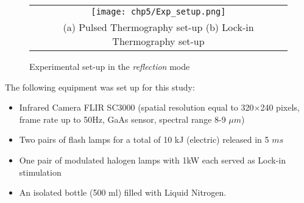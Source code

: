 \begin{figure}[ht]
   \hspace{-0.95cm}
   \begin{tabular}{c}
   \texttt{[image: chp5/Exp\_setup.png]}
   \\
   \footnotesize{(a) Pulsed Thermography set-up} \hspace{4cm} \footnotesize{(b) Lock-in Thermography set-up}   
   \end{tabular}  
   \caption{Experimental set-up in the \textit{reflection} mode}
   \label{Exp_setup}
\end{figure}


The following equipment was set up for this study:
\begin{itemize}
   \item Infrared Camera FLIR SC3000 (spatial resolution equal to 320$\times$240 pixels, frame rate up to 50Hz, GaAs sensor, spectral range 8-9 $\mu m$)
   \item Two pairs of flash 
    lamps for a total of 10 kJ (electric) released in 5 $ms$ 
   \item One pair of modulated halogen lamps with 1kW each served as Lock-in stimulation
   \item An isolated bottle (500 ml)
filled with
   Liquid Nitrogen.
\end{itemize}

